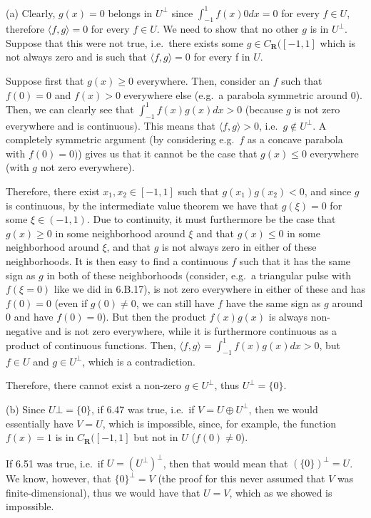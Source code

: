 \begin{solution}

    (a) Clearly, $g(x) = 0$ belongs in $U^\bot$ since $\int_{-1}^{1}f(x)0 dx = 0$ for every $f \in U$, therefore $\langle f, g \rangle = 0$ for every $f \in U$.
    We need to show that no other $g$ is in $U^\bot$. Suppose that this were not true, i.e.\ there exists some $g \in C_\textbf{R}([-1, 1]$ which is not always zero and is such that $\langle f, g \rangle = 0$ for every f in $U$.

    Suppose first that $g(x) \geq 0$ everywhere. Then, consider an $f$ such that $f(0) = 0$ and $f(x) > 0$ everywhere else (e.g.\ a parabola symmetric around 0). Then, we can clearly see that $\int_{-1}^{1}f(x)g(x) dx > 0$ (because $g$ is not zero everywhere and is continuous). This means that $\langle f, g \rangle > 0$, i.e.\ $g \notin U^\bot$. A completely symmetric argument (by considering e.g.\ $f$ as a concave parabola with $f(0) = 0)$) gives us that it cannot be the case that $g(x) \leq 0$ everywhere (with $g$ not zero everywhere).

    Therefore, there exist $x_1, x_2 \in [-1, 1]$ such that $g(x_1)g(x_2) < 0$, and since $g$ is continuous, by the intermediate value theorem we have that $g(\xi) = 0$ for some $\xi \in (-1, 1)$. Due to continuity, it must furthermore be the case that $g(x) \geq 0$ in some neighborhood around $\xi$ and that $g(x) \leq 0$ in some neighborhood around $\xi$, and that $g$ is not always zero in either of these neighborhoods. It is then easy to find a continuous $f$ such that it has the same sign as $g$ in both of these neighborhoods (consider, e.g.\ a triangular pulse with $f(\xi = 0)$ like we did in 6.B.17), is not zero everywhere in either of these and has $f(0) = 0$ (even if $g(0) \neq 0$, we can still have $f$ have the same sign as $g$ around 0 and have $f(0) = 0$). But then the product $f(x)g(x)$ is always non-negative and is not zero everywhere, while it is furthermore continuous as a product of continuous functions. Then, $\langle f, g \rangle = \int_{-1}^{1} f(x)g(x) dx > 0$, but $f \in U$ and $g \in U^\bot$, which is a contradiction.

    Therefore, there cannot exist a non-zero $g \in U^\bot$, thus $U^\bot = \{0\}$.

    (b) Since $U\bot = \{0\}$, if 6.47 was true, i.e.\ if $V = U \oplus U^\bot$, then we would essentially have $V = U$, which is impossible, since, for example, the function $f(x) = 1$ is in $C_\textbf{R}([-1, 1]$ but not in $U$ ($f(0) \neq 0$).

    If 6.51 was true, i.e.\ if $U = (U^\bot)^\bot$, then that would mean that $(\{0\})^\bot = U$. We know, however, that $\{0\}^\bot = V$ (the proof for this never assumed that $V$ was finite-dimensional), thus we would have that $U = V$, which as we showed is impossible.
    
\end{solution}
